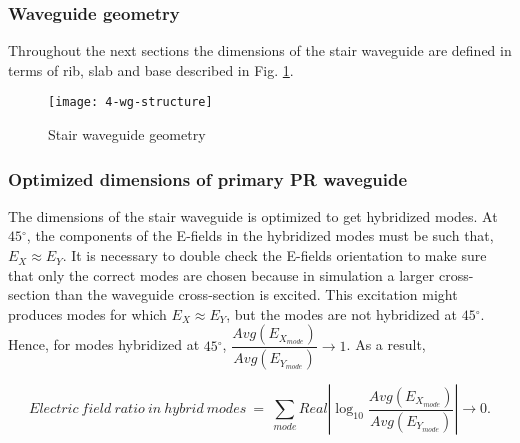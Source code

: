 \documentclass[../report.tex]{subfiles}
\begin{document}
\subsubsection{Waveguide geometry}
Throughout the next sections the dimensions of the stair waveguide are defined in terms of rib, slab and base described in Fig. \ref{fig:4_wg_structure}.   

\begin{figure}[H] %
	\centering
	\texttt{[image: 4-wg-structure]}
	\caption{Stair waveguide geometry}
	\label{fig:4_wg_structure}
\end{figure}


\subsubsection{Optimized dimensions of primary PR waveguide}
The dimensions of the stair waveguide is optimized to get hybridized modes. At $45{^\circ}$, the components of the E-fields in the hybridized modes must be such that, $E_X \approx E_Y$. It is necessary to double check the E-fields orientation to make sure that only the correct modes are chosen because in simulation a larger cross-section than the waveguide cross-section is excited. This excitation might produces modes for which $E_X \approx E_Y$, but the modes are not hybridized at $45{^\circ}$. Hence, for modes hybridized at $45{^\circ}$, $\dfrac {Avg(E_{X_{mode}})} {Avg(E_{Y_{mode}})} \rightarrow 1$. As a result, 

\begin{equation}\label{eq:wg_dim_eq}
Electric ~ field ~ ratio ~ in ~ hybrid ~ modes ~ = ~ \sum _{mode}Real\left| \log _{10}\dfrac {Avg(E_{X_{mode}})} {Avg(E_{Y_{mode}})}\right| \rightarrow 0. 
\end{equation}
\end{document}
